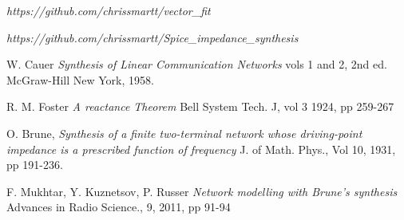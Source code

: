 \begin{thebibliography}{9}

\textsl{https://github.com/chrissmartt/vector\_fit}

\textsl{https://github.com/chrissmartt/Spice\_impedance\_synthesis}


W. Cauer
\textsl{Synthesis of Linear Communication Networks}
vols 1 and 2, 2nd ed. McGraw-Hill New York, 1958.

R. M. Foster
\textsl{A reactance Theorem}
Bell System Tech. J, vol 3 1924, pp 259-267

O. Brune,
\textsl{Synthesis of a finite two-terminal network whose driving-point impedance is a prescribed function of frequency}
J. of Math. Phys., Vol 10, 1931, pp 191-236.

F. Mukhtar, Y. Kuznetsov, P. Russer
\textsl{Network modelling with Brune's synthesis}
Advances in Radio Science., 9,  2011, pp 91-94

\end{thebibliography}


